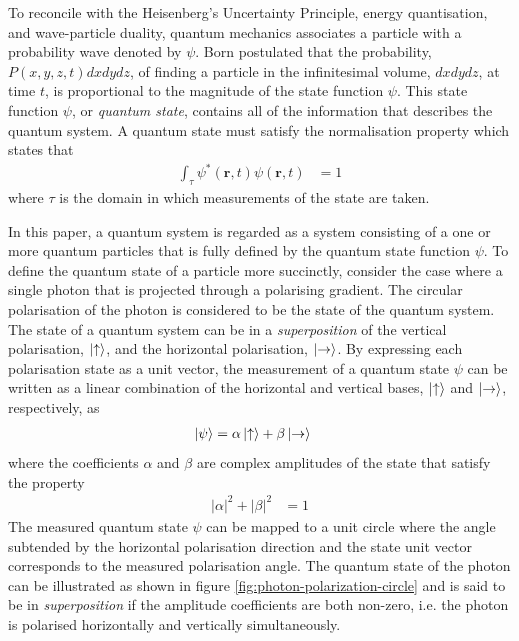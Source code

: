 To reconcile with the Heisenberg's Uncertainty Principle, energy quantisation, and wave-particle duality, quantum mechanics associates a particle with a probability wave denoted by $\psi$. Born postulated that the probability, $P(x,y,z,t)dxdydz$, of finding a particle in the infinitesimal volume, $dxdydz$, at time $t$, is proportional to the magnitude of the state function $\psi$. This state function $\psi$, or \textit{quantum state}, contains all of the information that describes the quantum system. A quantum state must satisfy the normalisation property which states that
\begin{align}
	\int_{\tau} \psi^* (\mathbf{r}, t) \psi(\mathbf{r}, t) & = 1 
\end{align}
where $\tau$ is the domain in which measurements of the state are taken.

In this paper, a quantum system is regarded as a system consisting of a one or more quantum particles that is fully defined by the quantum state function $\psi$. To define the quantum state of a particle more succinctly, consider the case where a single photon that is projected through a polarising gradient. The circular polarisation of the photon is considered to be the state of the quantum system. The state of a quantum system can be in a \textit{superposition} of the vertical polarisation, $\ket{\uparrow}$, and the horizontal polarisation, $\ket{\rightarrow}$. By expressing each polarisation state as a unit vector, the measurement of a quantum state $\psi$ can be written as a linear combination of the horizontal and vertical bases, $\ket{\uparrow}$ and $\ket{\rightarrow}$, respectively, as
\begin{align}
	\ket{\psi}	& = \alpha \ket{\uparrow} + \beta \ket{\rightarrow}
\end{align} 
where the coefficients $\alpha$ and $\beta$ are complex amplitudes of the state that satisfy the property 
\begin{align}\label{eqn:normalisation-condition}
	|\alpha|^2 + |\beta|^2	& = 1
\end{align}
The measured quantum state $\psi$ can be mapped to a unit circle where the angle subtended by the horizontal polarisation direction and the state unit vector corresponds to the measured polarisation angle. The quantum state of the photon can be illustrated as shown in figure \ref{fig:photon-polarization-circle} and is said to be in \textit{superposition} if the amplitude coefficients are both non-zero, i.e. the photon is polarised horizontally and vertically simultaneously. 
